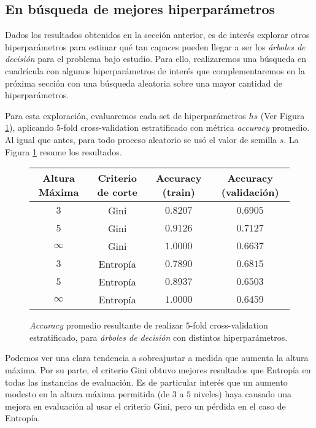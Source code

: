 \subsection{En búsqueda de mejores hiperparámetros}

Dados los resultados obtenidos en la sección anterior, es de interés explorar otros hiperparámetros para estimar qué tan capaces pueden llegar a ser los \textit{árboles de decisión} para el problema bajo estudio. Para ello, realizaremos una búsqueda en cuadrícula con algunos hiperparámetros de interés que complementaremos en la próxima sección con una búsqueda aleatoria sobre una mayor cantidad de hiperparámetros.

Para esta exploración, evaluaremos cada set de hiperparámetros $hs$ (Ver Figura \ref{grid_search}), aplicando $5$-fold cross-validation estratificado con métrica \textit{accuracy} promedio. Al igual que antes, para todo proceso aleatorio se usó el valor de semilla $s$. La Figura \ref{grid_search} resume los resultados. 

\vspace{0.5em}
\begin{figure}[!htbp]
    \begin{center}
        \begin{tabular}{ |c|c|c|c| } 
         \hline
        Altura Máxima   & Criterio de corte & Accuracy (train)  & Accuracy (validación) \\
        \hline
        $3$             & Gini              &  $0.8207$         & $0.6905$  \\ 
        $5$             & Gini              &  $0.9126$         & $0.7127$  \\
        $\infty$        & Gini              &  $1.0000$         & $0.6637$  \\ 
        $3$             & Entropía          &  $0.7890$         & $0.6815$  \\
        $5$             & Entropía          &  $0.8937$         & $0.6503$  \\ 
        $\infty$        & Entropía          &  $1.0000$         & $0.6459$  \\ 
        \hline
        \end{tabular}
    \end{center}
    \caption{\textit{Accuracy} promedio resultante de realizar $5$-fold cross-validation estratificado, para \textit{árboles de decisión} con distintos hiperparámetros.} \label{grid_search}
\end{figure}
 
Podemos ver una clara tendencia a sobreajustar a medida que aumenta la altura máxima. Por su parte, el criterio Gini obtuvo mejores resultados que Entropía en todas las instancias de evaluación. Es de particular interés que un aumento modesto en la altura máxima permitida (de $3$ a $5$ niveles) haya causado una mejora en evaluación al usar el criterio Gini, pero un pérdida en el caso de Entropía.
